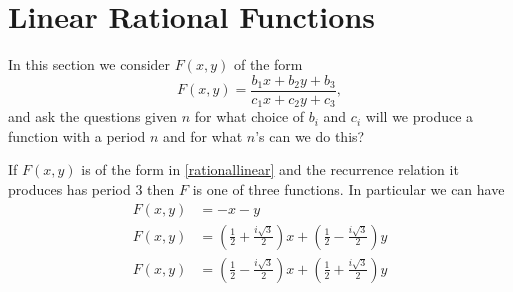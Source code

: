 \documentclass[12pt]{article}
\begin{document}
\section{Linear Rational Functions}
In this section we consider $F(x,y)$ of the form
\begin{equation}
\label{rationallinear}
F(x,y) = \frac{b_1 x+b_2 y + b_3}{c_1 x + c_2 y+ c_3},
\end{equation}
and ask the questions given $n$ for what choice of $b_i$ and $c_i$ will we produce a function with a period $n$ and for what $n$'s can we do this?

\begin{proposition} 
If $F(x,y)$ is of the form in \ref{rationallinear} and the recurrence relation it produces has period $3$ then $F$ is one of three functions. In particular we can have 
\begin{align*}
F(x,y) &= -x-y \\
F(x,y) &= \left( \frac{1}{2} +\frac{i\sqrt{3}}{2} \right) x + \left( \frac{1}{2} -\frac{i\sqrt{3}}{2} \right) y \\
F(x,y) &= \left( \frac{1}{2} -\frac{i\sqrt{3}}{2} \right) x + \left( \frac{1}{2} +\frac{i\sqrt{3}}{2} \right) y
\end{align*}
\end{proposition}
\end{document}
